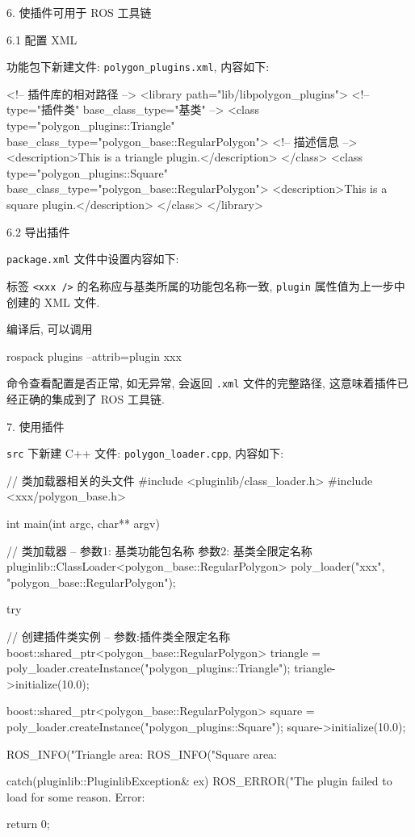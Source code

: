 \documentclass[openany, fontset=windowsold]{ctexbook}
\theoremstyle{kaiti}
\theoremstyle{normal}
\begin{document}
6. 使插件可用于 ROS 工具链

6.1 配置 XML

功能包下新建文件: \verb|polygon_plugins.xml|, 内容如下:

\begin{xml}
  <!-- 插件库的相对路径 -->
  <library path="lib/libpolygon_plugins">
    <!-- type="插件类" base_class_type="基类" -->
    <class type="polygon_plugins::Triangle" base_class_type="polygon_base::RegularPolygon">
      <!-- 描述信息 -->
      <description>This is a triangle plugin.</description>
    </class>
    <class type="polygon_plugins::Square" base_class_type="polygon_base::RegularPolygon">
      <description>This is a square plugin.</description>
    </class>
  </library>
\end{xml}

6.2 导出插件

\verb|package.xml| 文件中设置内容如下:


标签 \verb|<xxx />| 的名称应与基类所属的功能包名称一致, \verb|plugin| 属性值为上一步中创建的 XML 文件.

编译后, 可以调用

\begin{bash}
  rospack plugins --attrib=plugin xxx
\end{bash}

命令查看配置是否正常, 如无异常, 会返回 \verb|.xml| 文件的完整路径, 这意味着插件已经正确的集成到了 ROS 工具链.

7. 使用插件

\verb|src| 下新建 C++ 文件: \verb|polygon_loader.cpp|, 内容如下:

\begin{cpp}
  // 类加载器相关的头文件
  #include <pluginlib/class_loader.h>
  #include <xxx/polygon_base.h>

  int main(int argc, char** argv)
  {
    // 类加载器 -- 参数1: 基类功能包名称 参数2: 基类全限定名称
    pluginlib::ClassLoader<polygon_base::RegularPolygon> poly_loader("xxx", "polygon_base::RegularPolygon");

    try
    {
      // 创建插件类实例 -- 参数:插件类全限定名称
      boost::shared_ptr<polygon_base::RegularPolygon> triangle = poly_loader.createInstance("polygon_plugins::Triangle");
      triangle->initialize(10.0);

      boost::shared_ptr<polygon_base::RegularPolygon> square = poly_loader.createInstance("polygon_plugins::Square");
      square->initialize(10.0);

      ROS_INFO("Triangle area: %
      ROS_INFO("Square area: %
    }
    catch(pluginlib::PluginlibException& ex)
    {
      ROS_ERROR("The plugin failed to load for some reason. Error: %
    }

    return 0;
  }
\end{cpp}
\end{document}
